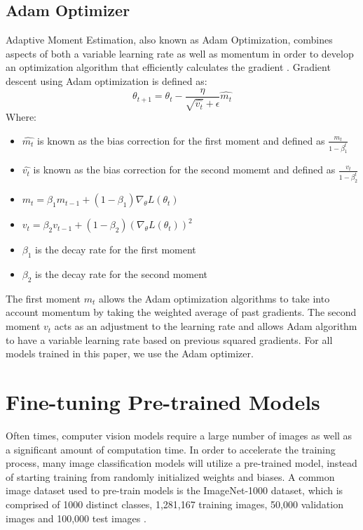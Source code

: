 \documentclass [MAS] {uclathes}
\begin{document}
\subsection{Adam Optimizer}
Adaptive Moment Estimation, also known as Adam Optimization, combines aspects of both a variable learning rate as well 
as momentum in order to develop an optimization algorithm that efficiently calculates the gradient \cite{adam}. Gradient descent 
using Adam optimization is defined as:
\[\theta_{t+1} = \theta_{t} - \frac{\eta}{\sqrt{\hat{v_t}} + \epsilon} \hat{m_{t}}\]
Where:
\begin{itemize}
    \item \(\hat{m_{t}}\) is known as the bias correction for the first moment and defined as \(\frac{m_t}{1-\beta_1^t}\)
    \item \(\hat{v_t}\) is known as the bias correction for the second momemt and defined as \(\frac{v_t}{1-\beta_2^t}\)
    \item \(m_t = \beta_1 m_{t-1} + (1 - \beta_1) \nabla_{\theta} L(\theta_t)\)
    \item \(v_t = \beta_2 v_{t-1} + (1 - \beta_2) (\nabla_{\theta} L(\theta_t))^2\)
    \item \(\beta_1\) is the decay rate for the first moment
    \item \(\beta_2\) is the decay rate for the second moment
\end{itemize}

The first moment \(m_t\) allows the Adam optimization algorithms to take into account momentum by taking the weighted 
average of past gradients. The second moment \(v_t\) acts as an adjustment to the learning rate and allows Adam 
algorithm to have a variable learning rate based on previous squared gradients. For all models trained in this paper, we 
use the Adam optimizer.

\section{Fine-tuning Pre-trained Models}
Often times, computer vision models require a large number of images as well as a significant amount of computation 
time. In order to accelerate the training process, many image classification models will utilize a pre-trained model, 
instead of starting training from randomly initialized weights and biases. A common image dataset used to pre-train 
models is the ImageNet-1000 dataset, which is comprised of 1000 distinct classes, 1,281,167 training images, 50,000 
validation images and 100,000 test images \cite{transfer}.
\end{document}
